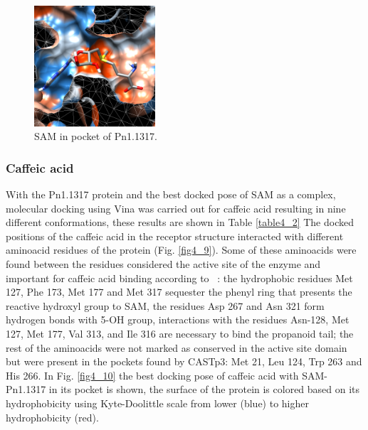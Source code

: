 \documentclass[12pt]{article}
\newcommand{\textcite}[1]{\citeauthor{#1}~\citeyear{#1}}
\begin{document}
	\FloatBarrier
	\begin{figure}[h!]
		\centering
		\includegraphics[width=0.4\textwidth]{../4/Dock/chimera.png}
		\caption{SAM in pocket of Pn1.1317.}
		\label{fig4_8}
	\end{figure}
	\FloatBarrier
	
	
	\subsubsection{Caffeic acid}
	
	With the Pn1.1317 protein and the best docked pose of SAM as a complex, molecular docking using Vina was carried out for caffeic acid resulting in nine different conformations, these results are shown in Table \ref{table4_2} The docked positions of the caffeic acid in the receptor structure interacted with different aminoacid residues of the protein (Fig. \ref{fig4_9}). Some of these aminoacids were found between the residues considered the active site of the enzyme and important for caffeic acid binding according to \textcite{caff}: the hydrophobic residues Met 127, Phe 173, Met 177 and Met 317 sequester the phenyl ring that presents the reactive hydroxyl group to SAM, the residues Asp 267 and Asn 321 form hydrogen bonds with 5-OH group, interactions with the residues Asn-128, Met 127, Met 177, Val 313, and Ile 316 are necessary to bind the propanoid tail;
	the rest of the aminoacids were not marked as conserved in the active site domain but were present in the pockets found by CASTp3: Met 21, Leu 124, Trp 263 and His 266. In Fig. \ref{fig4_10} the best docking pose of caffeic acid with SAM-Pn1.1317 in its pocket is shown, the surface of the protein is colored based on its hydrophobicity using Kyte-Doolittle scale from lower (blue) to higher hydrophobicity (red).
	
\end{document}
